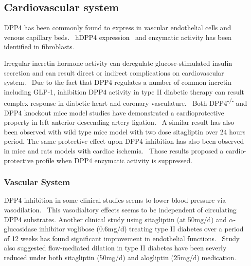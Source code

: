 \subsection{Cardiovascular system}
DPP4 has been commonly found to express in vascular endothelial cells and venous capillary beds.~\cite{Matheeussen2013,Shigeta2012} hDPP4 expression~\cite{Nemoto1999} and enzymatic activity has been identified in fibroblasts.~\cite{Ospelt2010}
\par 
Irregular incretin hormone activity can deregulate glucose-stimulated insulin secretion and can result direct or indirect complications on cardiovascular system.~\cite{Ussher2012} Due to the fact that DPP4 regulates a number of common incretin including GLP-1, inhibition DPP4 activity in type II diabetic therapy can result complex response in diabetic heart and coronary vasculature.~\cite{Ussher2014} Both DPP4\textsuperscript{-/-} and DPP4 knockout mice model studies have demonstrated a cardioprotective property in left anterior descending artery ligation.~\cite{Sauvé2010} A similar result has also been observed with wild type mice model with two dose sitagliptin over 24 hours period. The same protective effect upon DPP4 inhibition has also been observed in mice and rats models with cardiac ischemia.~\cite{Ussher2012} Those results proposed a cardio-protective profile when DPP4 enzymatic activity is suppressed. 
\par 

\subsubsection{Vascular System}
DPP4 inhibition in some clinical studies seems to lower blood pressure via vasodilation.~\cite{Kröller-Schön2012} This vasodialtory effects seems to be independent of circulating DPP4 substrates. Another clinical study using sitagliptin (at 50mg/d) and $\alpha$-glucosidase inhibitor voglibose (0.6mg/d) treating type II diabetes over a period of 12 weeks has found significant improvement in endothelial functions.~\cite{Nakamura2014} Study also suggested flow-mediated dilation in type II diabetes have been severly reduced under both sitagliptin (50mg/d) and alogliptin (25mg/d) medication. 